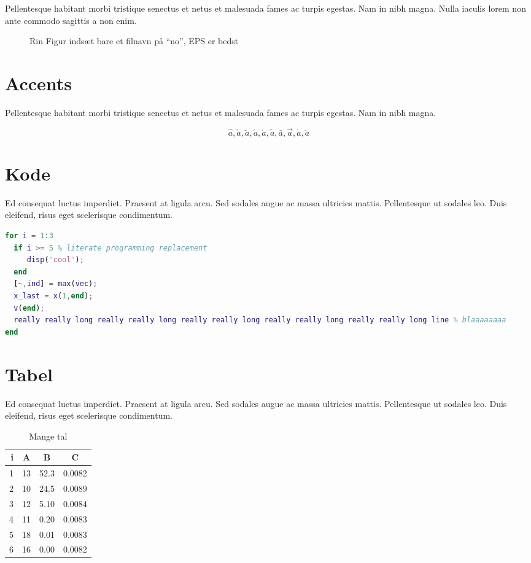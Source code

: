 \documentclass[a4paper]{article}
\begin{document}
Pellentesque habitant morbi tristique senectus et netus et malesuada fames ac turpis egestas. Nam in nibh magna. Nulla iaculis lorem non ante commodo sagittis a non enim.
\begin{figure}[H]
	\centering
	\caption{Rin Figur indsæt bare et filnavn på ``no'', EPS er bedst}
\end{figure}

\section {Accents}

Pellentesque habitant morbi tristique senectus et netus et malesuada fames ac turpis egestas. Nam in nibh magna.

\begin{equation}
\hat{a}, \check{a}, \breve{a}, \acute{a}, \grave{a}, \tilde{a}, \bar{a}, \vec{a}, \dot{a}, \ddot{a}
\end{equation}

\section {Kode}

Ed consequat luctus imperdiet. Praesent at ligula arcu. Sed sodales augue ac massa ultricies mattis. Pellentesque ut sodales leo. Duis eleifend, risus eget scelerisque condimentum.

\begin{lstlisting}[language=MatLab]
for i = 1:3
  if i >= 5 % literate programming replacement
     disp('cool');
  end
  [~,ind] = max(vec);
  x_last = x(1,end);
  v(end);
  really really long really really long really really long really really long really really long line % blaaaaaaaa
end
\end{lstlisting}

\section {Tabel}

Ed consequat luctus imperdiet. Praesent at ligula arcu. Sed sodales augue ac massa ultricies mattis. Pellentesque ut sodales leo. Duis eleifend, risus eget scelerisque condimentum.

\begin{table}[H]
\centering
\begin{tabular}{r|c c c}
	i  & A   & B    & C\\ \hline
	1  & 13  & 52.3 & 0.0082 \\
	2  & 10  & 24.5 & 0.0089 \\
	3  & 12  & 5.10 & 0.0084 \\
	4  & 11  & 0.20 & 0.0083 \\
	5  & 18  & 0.01 & 0.0083 \\
	6  & 16  & 0.00 & 0.0082
\end{tabular}
\caption{Mange tal}
\end{table}
\end{document}
